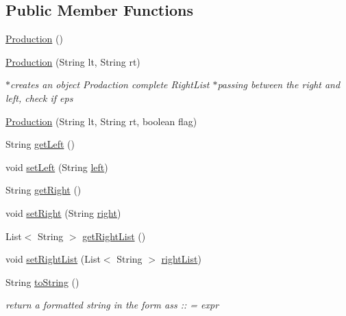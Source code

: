 \subsection*{Public Member Functions}
\begin{DoxyCompactItemize}
\item 
\hyperlink{classcontext_free_1_1grammar_1_1_production_a266aff6e67d35263dc262ea413eabefe}{Production} ()
\item 
\hyperlink{classcontext_free_1_1grammar_1_1_production_a1db3c4e260abdcac50a8425cc9bd901f}{Production} (String lt, String rt)
\begin{DoxyCompactList}\small\item\em $\ast$creates an object Prodaction complete Right\-List $\ast$passing between the right and left, check if eps \end{DoxyCompactList}\item 
\hyperlink{classcontext_free_1_1grammar_1_1_production_abc6df7181791245b8c3bf38871bc38b8}{Production} (String lt, String rt, boolean flag)
\item 
String \hyperlink{classcontext_free_1_1grammar_1_1_production_a6b42819c4b8af1aa759edf3ad5978f67}{get\-Left} ()
\item 
void \hyperlink{classcontext_free_1_1grammar_1_1_production_a6a9e81d7a3445993afd077cfc4d21a12}{set\-Left} (String \hyperlink{classcontext_free_1_1grammar_1_1_production_ad188a705cd57d55d32fd198e6af71f75}{left})
\item 
String \hyperlink{classcontext_free_1_1grammar_1_1_production_a0b6496bc60eefe88fd4652a6f01ec15e}{get\-Right} ()
\item 
void \hyperlink{classcontext_free_1_1grammar_1_1_production_aa36b86719aaccecb3c90a492c0d766e3}{set\-Right} (String \hyperlink{classcontext_free_1_1grammar_1_1_production_ab72c30da44fb1fbf41b9a70bf799ef58}{right})
\item 
List$<$ String $>$ \hyperlink{classcontext_free_1_1grammar_1_1_production_ae712218305325e3649fa26989db291de}{get\-Right\-List} ()
\item 
void \hyperlink{classcontext_free_1_1grammar_1_1_production_a84c7fa859310c752fa76fb1ecc3fedba}{set\-Right\-List} (List$<$ String $>$ \hyperlink{classcontext_free_1_1grammar_1_1_production_a51394e602f57b3e2f9b07d14fd01adb9}{right\-List})
\item 
String \hyperlink{classcontext_free_1_1grammar_1_1_production_a43d78cd85446efbbffe59a2278c410d1}{to\-String} ()
\begin{DoxyCompactList}\small\item\em return a formatted string in the form ass \-:\-: = expr \end{DoxyCompactList}\end{DoxyCompactItemize}
